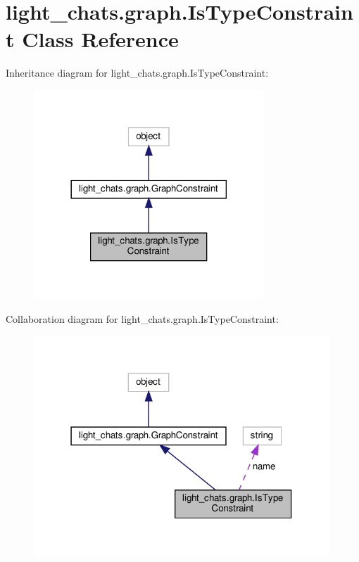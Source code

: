 \hypertarget{classlight__chats_1_1graph_1_1IsTypeConstraint}{}\section{light\+\_\+chats.\+graph.\+Is\+Type\+Constraint Class Reference}
\label{classlight__chats_1_1graph_1_1IsTypeConstraint}


Inheritance diagram for light\+\_\+chats.\+graph.\+Is\+Type\+Constraint\+:
\nopagebreak
\begin{figure}[H]
\begin{center}
\leavevmode
\includegraphics[width=245pt]{classlight__chats_1_1graph_1_1IsTypeConstraint__inherit__graph}
\end{center}
\end{figure}


Collaboration diagram for light\+\_\+chats.\+graph.\+Is\+Type\+Constraint\+:
\nopagebreak
\begin{figure}[H]
\begin{center}
\leavevmode
\includegraphics[width=315pt]{classlight__chats_1_1graph_1_1IsTypeConstraint__coll__graph}
\end{center}
\end{figure}
